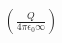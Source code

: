 \documentclass[preview]{standalone}
\begin{document}
\begin{align*}
\left(\frac{Q}{4\pi \epsilon_0 \infty}\right)
\end{align*}
\end{document}
